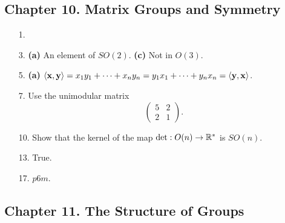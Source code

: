 \subsection*{Chapter 10. Matrix Groups and Symmetry}
 
{\small
\begin{itemize}
 
\bf\item[1.]\rm
{}
 
\bf\item[3.]\rm
{\bf (a)} An element of $SO(2)$.
{\bf (c)} Not in $O(3)$.
 
\bf\item[5.]\rm
{\bf (a)} 
$\langle {\bold x}, {\bold y} \rangle = x_1 y_1 + \cdots + x_n y_n =
y_1 x_1 + \cdots + y_n x_n = \langle {\bold y}, {\bold x} \rangle$.
 
\bf\item[7.]\rm
Use the unimodular matrix 
\[
\left(
\begin{array}{cc}
5 & 2 \\
2 & 1
\end{array}
\right).
\]
 
\bf\item[10.]\rm
Show that the kernel of the map $\det : O(n) \rightarrow {\Bbb R}^*$
is $SO(n)$.
 
\bf\item[13.]\rm
True.
 
\bf\item[17.]\rm
$p6m$.
 
 
 
\end{itemize}
}
 
\subsection*{Chapter 11. The Structure of Groups}
 
